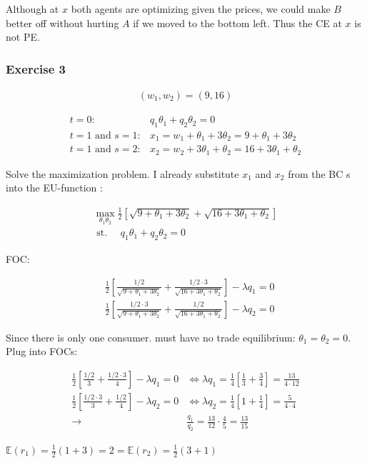 {{Although at $x$ both agents are optimizing given the prices, we could make $B$ better off without hurting $A$ if we moved to the bottom left. Thus the CE at $x$ is not PE.
}
{
\subsubsection*{Exercise 3}

\begin{align*}
    \left(w_{1}, w_{2}\right)=(9,16)
\end{align*}

\begin{enumerate}[label=(\alph*)]
{\item 
$$
\begin{array}{ll}
t=0: & q_{1} \theta_{1}+q_{2} \theta_{2}=0 \\
t=1 \text { and } s=1: & x_{1}=w_{1}+\theta_{1}+3 \theta_{2}=9+\theta_{1}+3 \theta_{2} \\
t=1 \text { and } s=2: & x_{2}=w_{2}+3 \theta_{1}+\theta_{2}=16+3 \theta_{1}+\theta_{2}
\end{array}
$$
}
{\item 
Solve the maximization problem. I already substitute $x_{1}$ and $x_{2}$ from the BC s into the EU-function :

$$
\begin{gathered}
\max _{\theta_{1} \theta_{2}} \frac{1}{2}\left[\sqrt{9+\theta_{1}+3 \theta_{2}}+\sqrt{16+3 \theta_{1}+\theta_{2}}\right] \\
\text { st. } \quad q_{1} \theta_{1}+q_{2} \theta_{2}=0
\end{gathered}
$$

FOC:

$$
\begin{aligned}
& \frac{1}{2}\left[\frac{1 / 2}{\sqrt{9+\theta_{1}+3 \theta_{2}}}+\frac{1 / 2 \cdot 3}{\sqrt{16+3 \theta_{1}+\theta_{2}}}\right]-\lambda q_{1}=0 \\
& \frac{1}{2}\left[\frac{1 / 2 \cdot 3}{\sqrt{9+\theta_{1}+3 \theta_{2}}}+\frac{1 / 2}{\sqrt{16+3 \theta_{1}+\theta_{2}}}\right]-\lambda q_{2}=0
\end{aligned}
$$

Since there is only one consumer. must have no trade equilibrium: $\theta_{1}=\theta_{2}=0$. Plug into FOCs:

$$
\begin{aligned}
    \frac{1}{2}\left[\frac{1 / 2}{3}+\frac{1 / 2 \cdot 3}{4}\right]-\lambda q_{1}=0 &\Longleftrightarrow \lambda q_{1}=\frac{1}{4}\left[\frac{1}{3}+\frac{3}{4}\right]=\frac{13}{4 \cdot 12} \\
    \frac{1}{2}\left[\frac{1 / 2 \cdot 3}{3}+\frac{1 / 2}{4}\right]-\lambda q_{2}=0 &\Longleftrightarrow \lambda q_{2}=\frac{1}{4}\left[1+\frac{1}{4}\right]=\frac{5}{4 \cdot 4} \\
    \longrightarrow & \frac{q_{1}}{q_{2}}=\frac{13}{12} \cdot \frac{4}{5}=\frac{13}{15}
\end{aligned}
$$
}
{\item 
$\mathbb{E}\left(r_{1}\right)=\frac{1}{2}(1+3)=2=\mathbb{E}\left(r_{2}\right)=\frac{1}{2}(3+1)$

}
\end{enumerate}}}
